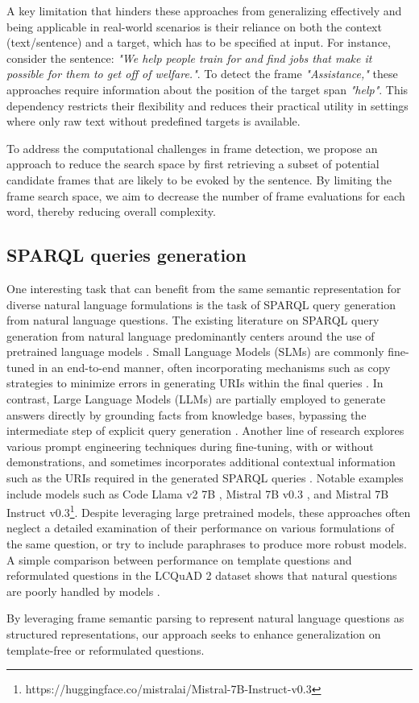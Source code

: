 A key limitation that hinders these approaches from generalizing effectively and being applicable in real-world scenarios is their reliance on both the context (text/sentence) and a target, which has to be specified at input. For instance, consider the sentence: \textit{"We help people train for and find jobs that make it possible for them to get off of welfare."}. To detect the frame \textit{"Assistance,"} these approaches require information about the position of the target span %
\textit{"help"}. This dependency restricts their flexibility and reduces their practical utility in settings where only raw text without predefined targets is available.

To address the computational challenges in frame detection, we propose an approach to reduce the search space by first retrieving a subset of potential candidate frames that are likely to be evoked by the sentence. By limiting the frame search space, we aim to decrease the number of frame evaluations for each word, thereby reducing overall complexity.

\subsection{SPARQL queries generation}
One interesting task that can benefit from the same semantic representation for diverse natural language formulations is the task of SPARQL query generation from natural language questions. The existing literature on SPARQL query generation from natural language predominantly centers around the use of pretrained language models \citep{diallo2024comprehensive, reyd2023assessing, banerjee2022modern, emonet2024llm, zahera2024generating}. Small Language Models (SLMs) are commonly fine-tuned in an end-to-end manner, often incorporating mechanisms such as copy strategies to minimize errors in generating URIs within the final queries \citep{diallo2024comprehensive, banerjee2022modern}. In contrast, Large Language Models (LLMs) are partially employed to generate answers directly by grounding facts from knowledge bases, bypassing the intermediate step of explicit query generation \citep{shavarani2024entity, alawwad2024enhancing, muennighoff2022sgpt}. Another line of research explores various prompt engineering techniques during fine-tuning, with or without demonstrations, and sometimes incorporates additional contextual information such as the URIs required in the generated SPARQL queries \citep{diallo2024comprehensive, muennighoff2022sgpt, luo2023chatkbqa}. Notable examples include models such as Code Llama v2 7B \citep{roziere2023code}, Mistral 7B v0.3 \citep{jiang2023mistral7b}, and Mistral 7B Instruct v0.3\footnote{https://huggingface.co/mistralai/Mistral-7B-Instruct-v0.3}. Despite leveraging large pretrained models, these approaches often neglect a detailed examination of their performance on various formulations of the same question, or try to include paraphrases to produce more robust models. A simple comparison between performance on template questions and reformulated questions in the LCQuAD 2 dataset shows that natural questions are poorly handled by models \citep{diallo2024comprehensive, reyd2023assessing}.   

By leveraging frame semantic parsing to represent natural language questions as structured representations, our approach seeks to enhance generalization on template-free or reformulated questions.